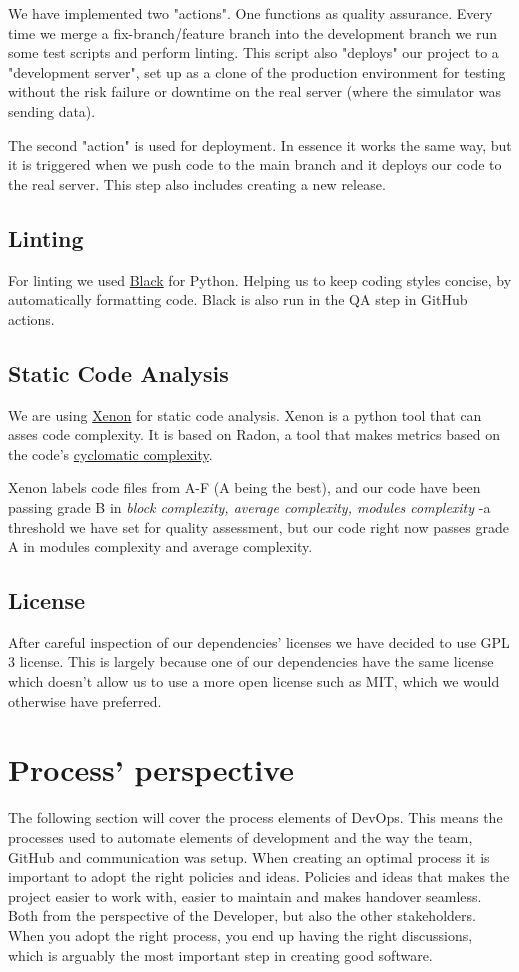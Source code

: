 \documentclass[12pt]{article}
\begin{document}
We have implemented two "actions". One functions as quality assurance. Every time we merge a fix-branch/feature branch into the development branch we run some test scripts and perform linting. This script also "deploys" our project to a "development server", set up as a clone of the production environment for testing without the risk failure or downtime on the real server (where the simulator was sending data).

The second "action" is used for deployment. In essence it works the same way, but it is triggered when we push code to the main branch and it deploys our code to the real server. This step also includes creating a new release.

\subsection{Linting}
For linting we used \href{https://github.com/psf/black}{Black} for Python. Helping us to keep coding styles concise, by automatically formatting code. Black is also run in the QA step in GitHub actions.

\subsection{Static Code Analysis}
We are using \href{https://xenon.readthedocs.io/en/stable/}{Xenon} for static code analysis. Xenon is a python tool that can asses code complexity. It is based on Radon, a tool that makes metrics based on the code's 
\href{https://radon.readthedocs.io/en/latest/intro.html}{cyclomatic complexity}. 

Xenon labels code files from A-F (A being the best), and our code have been passing grade B in \textit{block complexity, average complexity, modules complexity} -a threshold we have set for quality assessment, but our code right now passes grade A in modules complexity and average complexity.

\subsection{License}
After careful inspection of our dependencies' licenses we have decided to use GPL 3 license. This is largely because one of our dependencies have the same license which doesn't allow us to use a more open license such as MIT, which we would otherwise have preferred.


\section{Process' perspective}
The following section will cover the process elements of DevOps. This means the processes used to automate elements of development and the way the team, GitHub and communication was setup. When creating an optimal process it is important to adopt the right policies and ideas. Policies and ideas that makes the project easier to work with, easier to maintain and makes handover seamless. Both from the perspective of the Developer, but also the other stakeholders. When you adopt the right process, you end up having the right discussions, which is arguably the most important step in creating good software.
\end{document}
